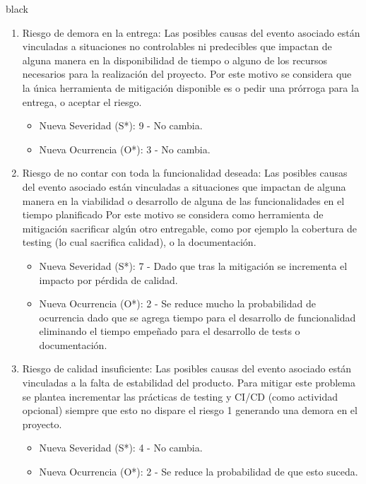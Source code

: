 \documentclass[
11pt, %
]{charter}
\begin{document}
\begin{consigna}{black}
\begin{enumerate}
	\item Riesgo de demora en la entrega: Las posibles causas del evento asociado están vinculadas a situaciones no controlables ni predecibles que impactan de alguna manera en la disponibilidad de tiempo o alguno de los recursos necesarios para la realización del proyecto. Por este motivo se considera que la única herramienta de mitigación disponible es o pedir una prórroga para la entrega, o aceptar el riesgo.
	\begin{itemize}
		\item Nueva Severidad (S*): 9 - No cambia.
		\item Nueva Ocurrencia (O*): 3 - No cambia.
	\end{itemize}
	
	\item Riesgo de no contar con toda la funcionalidad deseada: Las posibles causas del evento asociado están vinculadas a situaciones que impactan de alguna manera en la viabilidad o desarrollo de alguna de las funcionalidades en el tiempo planificado Por este motivo se considera como herramienta de mitigación sacrificar algún otro entregable, como por ejemplo la cobertura de testing (lo cual sacrifica calidad), o la documentación.
	\begin{itemize}
		\item Nueva Severidad (S*): 7 - Dado que tras la mitigación se incrementa el impacto por pérdida de calidad.
		\item Nueva Ocurrencia (O*): 2 - Se reduce mucho la probabilidad de ocurrencia dado que se agrega tiempo para el desarrollo de funcionalidad eliminando el tiempo empeñado para el desarrollo de tests o documentación.
	\end{itemize}
	
	
	\item Riesgo de calidad insuficiente: Las posibles causas del evento asociado están vinculadas a la falta de estabilidad del producto. Para mitigar este problema se plantea incrementar las prácticas de testing y CI/CD (como actividad opcional) siempre que esto no dispare el riesgo 1 generando una demora en el proyecto.
	\begin{itemize}
		\item Nueva Severidad (S*): 4 - No cambia.
		\item Nueva Ocurrencia (O*): 2 - Se reduce la probabilidad de que esto suceda.
	\end{itemize}	
	

\end{enumerate}
\end{consigna}
\end{document}

